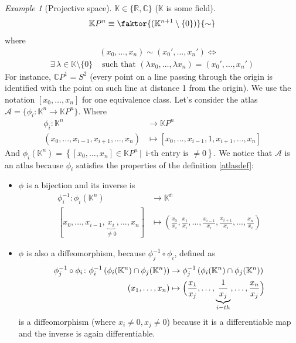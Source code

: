 \documentclass[a4paper,11pt,titlepage]{article}
\numberwithin{equation}{section}
\theoremstyle{definition}
\theoremstyle{remark}
\newtheorem{example}[theorem]{Example}
\newcommand{\rfield}{\mathbb{R}}
\begin{document}
\begin{example}[Projective space]
  $\mathbb{K} \in \{\rfield, \mathbb{C}\}$ ($\mathbb{K}$ is some field).
  $$\mathbb{K}P^n \equiv \faktor{(\mathbb{K}^{n+1} \setminus \{0\})}{\sim}$$
  where
  \begin{align*}&(x_0, \ldots, x_n) \sim (x_0', \ldots, x_n') \Longleftrightarrow \\
     \exists \, \lambda \in \mathbb{K}\setminus \{0\} &\text{ such that } (\lambda x_0, \ldots, \lambda x_n) = (x_0', \ldots, x_n')
  \end{align*}
  For instance, $\mathbb{C}P^1 = S^2$ (every point on a line passing through the origin is identified with the point on such line at distance 1 from the origin). We use the notation $[x_0, \ldots, x_n]$ for one equivalence class.
  Let's consider the atlas $\mathcal{A} = \{\phi_i \colon \mathbb{K}^n \rightarrow \mathbb{K} P^n \}$. Where
  \begin{align*}
    \phi_i \colon \mathbb{K}^n &\rightarrow \mathbb{K}P^n \\
    (x_0, \ldots, x_{i-1}, x_{i+1}, \ldots, x_n) &\mapsto [x_0, \ldots, x_{i-1}, 1, x_{i+1}, \ldots, x_n]
  \end{align*}
  And $\phi_i(\mathbb{K}^n) = \left\{[x_0, \ldots, x_n] \in \mathbb{K}P^n \, | \, \text{ i-th entry is } \not = 0 \right \}$.
  We notice that $\mathcal{A}$ is an atlas because $\phi_i$ satisfies the properties of the definition \ref{atlasdef}:
  \begin{itemize}
    \item $\phi$ is a bijection and its inverse is
    \begin{align*}
      \phi_i^{-1} \colon \phi_i(\mathbb{K}^n) & \rightarrow \mathbb{K^n} \\
      [x_0, \ldots, x_{i-1}, \underbrace{x_i}_{\not = 0}, \ldots, x_n] &\mapsto \left( \frac{x_0}{x_i}, \frac{x_1}{x_i}, \ldots, \frac{x_{i-1}}{x_i}, \frac{x_{i+1}}{x_i}, \ldots, \frac{x_n}{x_i} \right)
    \end{align*}
    \item $\phi$ is also a diffeomorphism, because $\phi_j^{-1} \circ \phi_i$, defined as
    \begin{align*}
      \phi_j^{-1} \circ \phi_i \colon \phi_i^{-1} \left(\phi_i(\mathbb{K}^n) \cap \phi_j(\mathbb{K}^n) \right) &\rightarrow \phi_j^{-1} \left(\phi_i(\mathbb{K}^n) \cap \phi_j(\mathbb{K}^n) \right) \\
      (x_1, \ldots, x_n) &\mapsto \Bigl( \frac{x_1}{x_j}, \ldots, \underbrace{\frac{1}{x_j}}_{i-th}, \ldots, \frac{x_n}{x_j} \Bigr)
    \end{align*}
    is a diffeomorphism (where $x_i \not = 0, x_j \not = 0$) because it is a differentiable map and the inverse is again differentiable.
  \end{itemize}
\end{example}
\end{document}
